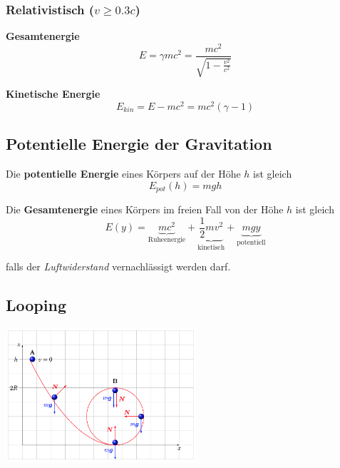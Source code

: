 \documentclass[7pt]{article}
\begin{document}
\begin{multicols*}{3}
\subsubsection{Relativistisch ($v \geq 0.3c$)}

\textbf{Gesamtenergie}
\begin{equation*}
	E = \gamma mc^2 = \frac{mc^2}{\sqrt{1-\frac{v^2}{c^2}}}
\end{equation*}

\textbf{Kinetische Energie}
\begin{equation*}
	E_{kin} = E - mc^2 = mc^2(\gamma - 1)
\end{equation*}

\subsection{Potentielle Energie der Gravitation}

Die \textbf{potentielle Energie} eines K{\"o}rpers auf der H{\"o}he $h$ ist gleich
\begin{equation*}
	E_{pot}(h) = mgh
\end{equation*}

Die \textbf{Gesamtenergie} eines K{\"o}rpers im freien Fall von der H{\"o}he $h$ ist gleich
\begin{equation*}
	E(y) = \underbrace{mc^2}_\text{Ruheenergie} + \underbrace{\frac{1}{2}mv^2}_\text{kinetisch} + \underbrace{mgy}_\text{potentiell}
\end{equation*}

falls der \emph{Luftwiderstand} vernachl{\"a}ssigt werden darf.

\subsection{Looping}

\begin{center}
	\includegraphics[width=200pt]{images/looping}
\end{center}


\end{multicols*}
\end{document}
